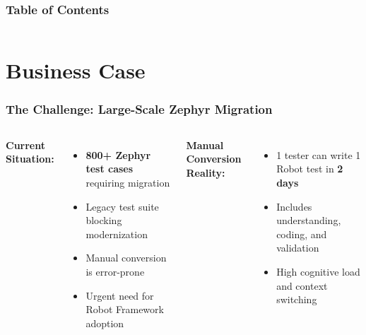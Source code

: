 
\frame{\titlepage}

\begin{frame}
\frametitle{Table of Contents}
\begin{columns}
{\large \tableofcontents[sections={1-6}]}

{\large \tableofcontents[sections={7-12}]}
\end{columns}
\end{frame}

\section{Business Case}
\begin{frame}
\frametitle{The Challenge: Large-Scale Zephyr Migration}
\begin{columns}
\textbf{Current Situation:}
\begin{itemize}
    \item \textbf{800+ Zephyr test cases} requiring migration
    \item Legacy test suite blocking modernization
    \item Manual conversion is error-prone
    \item Urgent need for Robot Framework adoption
\end{itemize}

\vspace{0.5cm}
\textbf{Manual Conversion Reality:}
\begin{itemize}
    \item 1 tester can write 1 Robot test in \textbf{2 days}
    \item Includes understanding, coding, and validation
    \item High cognitive load and context switching
\end{itemize}

\end{columns}
\end{frame}



